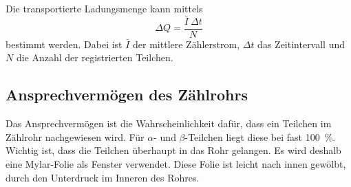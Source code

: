 \noindent Die transportierte Ladungsmenge kann mittels
\begin{equation}
    \Delta Q = \frac{\bar{I} \ \Delta t}{N}
    \label{ladung}
\end{equation}
bestimmt werden. Dabei ist $\bar{I}$ der mittlere Zählerstrom, $\Delta t$ das Zeitintervall und $N$ die Anzahl der registrierten Teilchen.

\subsection{Ansprechvermögen des Zählrohrs}

Das Ansprechvermögen ist die Wahrscheinlichkeit dafür, dass ein Teilchen im Zählrohr nachgewiesen wird. Für $\alpha$- und $\beta$-Teilchen liegt diese bei fast \SI{100}{\percent}. Wichtig ist, dass die Teilchen überhaupt in das Rohr gelangen. Es wird deshalb eine Mylar-Folie als Fenster verwendet. Diese Folie ist leicht nach innen gewölbt, durch den Unterdruck im Inneren des Rohres. %
